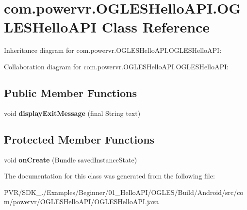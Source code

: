 \hypertarget{classcom_1_1powervr_1_1_o_g_l_e_s_hello_a_p_i_1_1_o_g_l_e_s_hello_a_p_i}{\section{com.\+powervr.\+O\+G\+L\+E\+S\+Hello\+A\+P\+I.\+O\+G\+L\+E\+S\+Hello\+A\+P\+I Class Reference}
\label{classcom_1_1powervr_1_1_o_g_l_e_s_hello_a_p_i_1_1_o_g_l_e_s_hello_a_p_i}
}


Inheritance diagram for com.\+powervr.\+O\+G\+L\+E\+S\+Hello\+A\+P\+I.\+O\+G\+L\+E\+S\+Hello\+A\+P\+I\+:


Collaboration diagram for com.\+powervr.\+O\+G\+L\+E\+S\+Hello\+A\+P\+I.\+O\+G\+L\+E\+S\+Hello\+A\+P\+I\+:
\subsection*{Public Member Functions}
\begin{DoxyCompactItemize}
\item 
\hypertarget{classcom_1_1powervr_1_1_o_g_l_e_s_hello_a_p_i_1_1_o_g_l_e_s_hello_a_p_i_a93096e81fe16d7c92ebd409c8a844362}{void {\bfseries display\+Exit\+Message} (final String text)}\label{classcom_1_1powervr_1_1_o_g_l_e_s_hello_a_p_i_1_1_o_g_l_e_s_hello_a_p_i_a93096e81fe16d7c92ebd409c8a844362}

\end{DoxyCompactItemize}
\subsection*{Protected Member Functions}
\begin{DoxyCompactItemize}
\item 
\hypertarget{classcom_1_1powervr_1_1_o_g_l_e_s_hello_a_p_i_1_1_o_g_l_e_s_hello_a_p_i_aee471e857abf13d8d8aa813406888b56}{void {\bfseries on\+Create} (Bundle saved\+Instance\+State)}\label{classcom_1_1powervr_1_1_o_g_l_e_s_hello_a_p_i_1_1_o_g_l_e_s_hello_a_p_i_aee471e857abf13d8d8aa813406888b56}

\end{DoxyCompactItemize}


The documentation for this class was generated from the following file\+:\begin{DoxyCompactItemize}
\item 
P\+V\+R/\+S\+D\+K\+\_./\+Examples/\+Beginner/01\+\_\+\+Hello\+A\+P\+I/\+O\+G\+L\+E\+S/\+Build/\+Android/src/com/powervr/\+O\+G\+L\+E\+S\+Hello\+A\+P\+I/O\+G\+L\+E\+S\+Hello\+A\+P\+I.\+java\end{DoxyCompactItemize}
